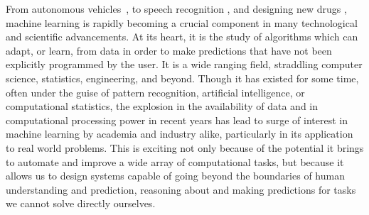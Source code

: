 
From autonomous vehicles~\citep{lefevre2014survey}, to speech recognition \citep{jurafsky2014speech},
and designing new drugs \citep{burbidge2001drug}, machine learning is rapidly becoming a 
crucial component in many technological and scientific advancements.  
At its heart, it is the study of algorithms which can adapt, or learn, from data in order
to make predictions that have not been explicitly programmed by the user.  It is a wide ranging field,
straddling computer science, statistics, engineering, and beyond. Though it has existed for some
time, often under the guise of pattern recognition, artificial intelligence, or computational 
statistics, the explosion in the availability of data and in computational processing power in recent
years has lead to surge of interest in machine learning by academia and industry alike, particularly 
in its application to real world problems.  This is exciting not only because of the potential it brings
to automate and improve a wide array of computational tasks, but because it allows us to design 
systems capable of going beyond the boundaries of human understanding and prediction, reasoning
about and making predictions for tasks we cannot solve directly ourselves.


